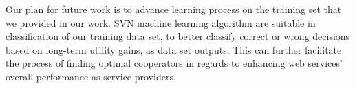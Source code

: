 \documentclass[10pt,journal,cspaper,compsoc]{IEEEtran}
\begin{document}
Our plan for future work is to advance learning process on the training set that we provided in our work. SVN machine learning algorithm are suitable in classification of our training data set, to better classify correct or wrong decisions based on long-term utility gains, as data set outputs. This can further facilitate the process of finding optimal cooperators in regards to enhancing web services' overall performance as service providers.




%



\end{document}
